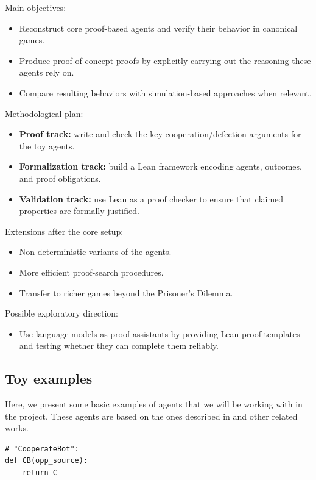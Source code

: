 \documentclass{article}
\begin{document}
Main objectives:
\begin{itemize}
  \item Reconstruct core proof-based agents and verify their behavior in canonical games.
  \item Produce proof-of-concept proofs by explicitly carrying out the reasoning these agents rely on.
  \item Compare resulting behaviors with simulation-based approaches when relevant.
\end{itemize}

Methodological plan:
\begin{itemize}
  \item \textbf{Proof track:} write and check the key cooperation/defection arguments for the toy agents.
  \item \textbf{Formalization track:} build a Lean framework encoding agents, outcomes, and proof obligations.
  \item \textbf{Validation track:} use Lean as a proof checker to ensure that claimed properties are formally justified.
\end{itemize}

Extensions after the core setup:
\begin{itemize}
  \item Non-deterministic variants of the agents.
  \item More efficient proof-search procedures.
  \item Transfer to richer games beyond the Prisoner's Dilemma.
\end{itemize}

Possible exploratory direction:
\begin{itemize}
  \item Use language models as proof assistants by providing Lean proof templates and testing whether they can complete them reliably.
\end{itemize}

\subsection{Toy examples}
Here, we present some basic examples of agents that we will be working with in the project. These agents are based on the ones described in \cite{critch2022cooperativeuncooperativeinstitutiondesigns} and other related works.

\begin{verbatim}
# "CooperateBot":
def CB(opp_source):
    return C
\end{verbatim}
\end{document}
